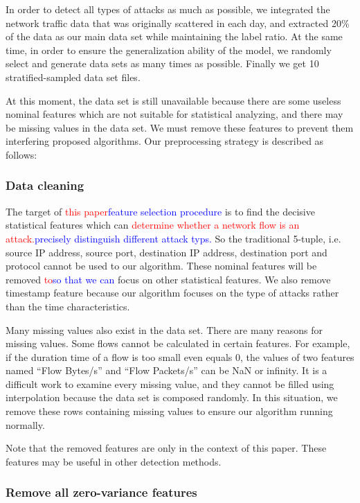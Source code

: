 \documentclass{ieeeaccess}
\theoremstyle{definition}
\newcommand{\change}[2]{\textcolor{red}{#1}\textcolor{blue}{#2}}
\begin{document}
In order to detect all types of attacks as much as possible, we integrated the network traffic data that was originally scattered in each day, and extracted 20\% of the data as our main data set while maintaining the label ratio. At the same time, in order to ensure the generalization ability of the model, we randomly select and generate data sets as many times as possible. Finally we get 10 stratified-sampled data set files.

At this moment, the data set is still unavailable because there are some useless nominal features which are not suitable for statistical analyzing, and there may be missing values in the data set. We must remove these features to prevent them interfering proposed algorithms. Our preprocessing strategy is described as follows:

\subsubsection{Data cleaning}
The target of \change{this paper}{feature selection procedure} is to find the decisive statistical features which can \change{determine whether a network flow is an attack.}{precisely distinguish different attack typs.}
So the traditional 5-tuple, i.e. source IP address, source port, destination IP address, destination port and protocol cannot be used to our algorithm.
These nominal features will be removed \change{to}{so that we can} focus on other statistical features.
We also remove timestamp feature because our algorithm focuses on the type of attacks rather than the time characteristics.

Many missing values also exist in the data set. There are many reasons for missing values. Some flows cannot be calculated in certain features. For example, if the duration time of a flow is too small even equals 0, the values of two features named ``Flow Bytes/s'' and ``Flow Packets/s'' can be NaN or infinity. It is a difficult work to examine every missing value, and they cannot be filled using interpolation because the data set is composed randomly. In this situation, we remove these rows containing missing values to ensure our algorithm running normally.

Note that the removed features are only in the context of this paper. These features may be useful in other detection methods.

\subsubsection{Remove all zero-variance features}
\end{document}
